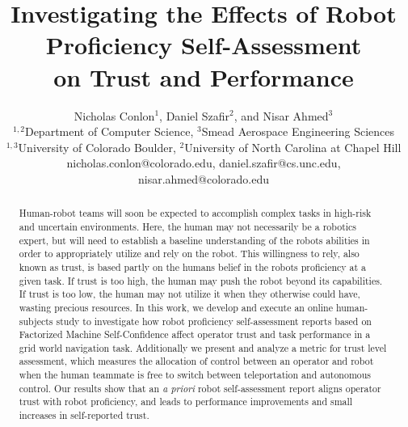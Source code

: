 \documentclass[aaai]{article}
\begin{document}
%
\title{Investigating the Effects of Robot Proficiency Self-Assessment \\ on Trust and Performance}
\author{Nicholas Conlon$^{1}$, Daniel Szafir$^{2}$, and Nisar Ahmed$^{3}$\\
$^{1,2}$Department of Computer Science, $^{3}$Smead Aerospace Engineering Sciences\\
$^{1,3}$University of Colorado Boulder, $^{2}$University of North Carolina at Chapel Hill\\
nicholas.conlon@colorado.edu, daniel.szafir@cs.unc.edu, nisar.ahmed@colorado.edu\\
}
\newcommand{\nickComm}[1]{{\color{red}{ \textbf{NJC:} #1}}}
\newcommand{\brettComm}[1]{{\color{blue}{ \textbf{BWI:} #1}}}
\newcommand{\nisarComm}[1]{{\color{magenta}{ \textbf{NRA:} #1}}}

\maketitle
\thispagestyle{empty}
\pagestyle{empty}



\begin{abstract}
Human-robot teams will soon be expected to accomplish complex tasks in high-risk and uncertain environments. Here, the human may not necessarily be a robotics expert, but will need to establish a baseline understanding of the robots abilities in order to appropriately utilize and rely on the robot. This willingness to rely, also known as trust, is based partly on the humans belief in the robots proficiency at a given task. If trust is too high, the human may push the robot beyond its capabilities. If trust is too low, the human may not utilize it when they otherwise could have, wasting precious resources. In this work, we develop and execute an online human-subjects study to investigate how robot proficiency self-assessment reports based on Factorized Machine Self-Confidence affect operator trust and task performance in a grid world navigation task. Additionally we present and analyze a metric for trust level assessment, which measures the allocation of control between an operator and robot when the human teammate is free to switch between teleportation and autonomous control. Our results show that an \textit{a priori} robot self-assessment report aligns operator trust with robot proficiency, and leads to performance improvements and small increases in self-reported trust.
\end{abstract}
\end{document}
